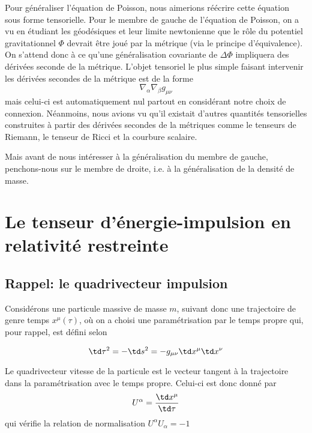 Pour généraliser l'équation de Poisson, nous aimerions réécrire cette équation sous forme tensorielle. Pour le membre de gauche de l'équation de Poisson, on a vu en étudiant les géodésiques et leur limite newtonienne que le rôle du potentiel gravitationnel $\Phi$ devrait être joué par la métrique (via le principe d'équivalence). On s'attend donc à ce qu'une généralisation covariante de $\Delta \Phi$ impliquera des dérivées seconde de la métrique. L'objet tensoriel le plus simple faisant intervenir les dérivées secondes de la métrique est de la forme
\begin{equation}
    \nabla_{\alpha}\nabla_{\beta}g_{\mu \nu}
\end{equation}
mais celui-ci est automatiquement nul partout en considérant notre choix de connexion. Néanmoins, nous avions vu qu'il existait d'autres quantités tensorielles construites à partir des dérivées secondes de la métriques comme le tenseurs de Riemann, le tenseur de Ricci et la courbure scalaire. 

Mais avant de nous intéresser à la généralisation du membre de gauche, penchons-nous sur le membre de droite, i.e. à la généralisation de la densité de masse.

\section{Le tenseur d'énergie-impulsion en relativité restreinte}

\subsection{Rappel: le quadrivecteur impulsion}

Considérons une particule massive de masse $m$, suivant donc une trajectoire de genre temps $x^{\mu}(\tau)$, où on a choisi une paramétrisation par le temps propre qui, pour rappel, est défini selon

\begin{equation}
    \td \tau ^2 = -\td s^2 = -g_{\mu \nu}\td x^{\mu}\td x^{\nu}
\end{equation}
\begin{theoremframe}
    \begin{defi}
        Le quadrivecteur vitesse de la particule est le vecteur tangent à la trajectoire dans la paramétrisation avec le temps propre. Celui-ci est donc donné par
        \begin{equation}
            U^{\alpha} = \frac{\td x^{\mu}}{\td \tau}
        \end{equation}
        qui vérifie la relation de normalisation $U^{\alpha}U_{\alpha} = -1$
    \end{defi}
\end{theoremframe}

